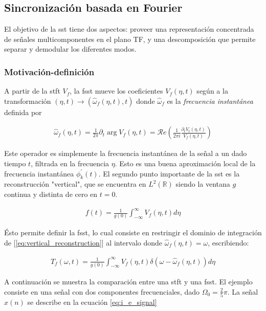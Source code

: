\subsection*{Sincronización basada en Fourier}

\indent El objetivo de la \acrshort{sst} tiene dos aspectos: proveer una representación concentrada de señales multicomponentes en el plano TF, y una descomposición que permite separar y demodular los diferentes modos. 

\subsubsection*{Motivación-definición}

\indent A partir de la \acrshort{stft} $V_f$, la \acrshort{fsst} mueve los coeficientes $V_f(\eta,t)$ según a la transformación $(\eta,t) \rightarrow (\hat{\omega}_f(\eta,t),t)$ donde $\hat{\omega}_f$ es la \textit{frecuencia instantánea} definida por

\begin{align}
    \hat{\omega}_f(\eta,t) = \frac{1}{2\pi} \partial_t \arg V_f(\eta,t) = \mathcal{R}e\left(\frac{1}{2\pi i}\frac{\partial_t V_t(\eta,t)}{V_f(\eta,t)}\right)
\end{align}

\indent Este operador es simplemente la frecuencia instantánea de la señal a un dado tiempo $t$, filtrada en la frecuencia $\eta$. Esto es una buena aproximación local de la frecuencia instantánea $\phi_k^{'}(t)$. El segundo punto importante de la \acrshort{sst} es la reconstrucción "vertical", que se encuentra en $L^2(\mathbb{R})$ siendo la ventana $g$ continua y distinta de cero en $t=0$.

\begin{align} \label{eq:vertical_reconstruction}
    f(t) = \frac{1}{g(0)} \int_{-\infty}^\infty V_f(\eta,t)d\eta
\end{align}

\indent Ésto permite definir la \acrshort{fsst}, lo cual consiste en restringir el dominio de integración de [\ref{eq:vertical_reconstruction}] al intervalo donde $\hat{\omega}_f(\eta,t) = \omega$, escribiendo:

\begin{align}
    T_f(\omega,t) = \frac{1}{g(0)} \int_{-\infty}^\infty V_f(\eta,t)\delta(\omega-\hat{\omega}_f(\eta,t))d\eta
\end{align}

\indent A continuación se muestra la comparación entre una \acrshort{stft} y una \acrshort{fsst}. El ejemplo consiste en una señal con dos componentes frecuenciales, dado $\Omega_0=\frac{2}{5}\pi$. La señal $x(n)$ se describe en la ecuación \ref{eq:i_e_signal}

